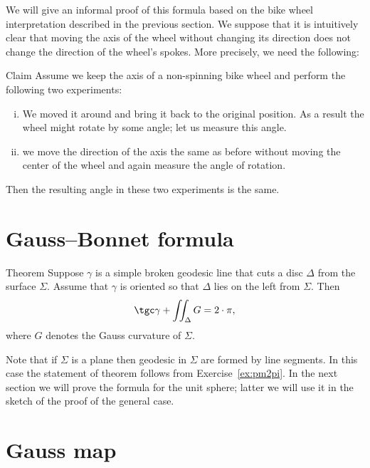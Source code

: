 We will give an informal proof of this formula based on the bike wheel interpretation described in the previous section.
We suppose that it is intuitively clear that moving the axis of the wheel without changing its direction does not change the direction of the wheel's spokes.
More precisely, we need the following:

\begin{thm}{Claim}
Assume we keep the axis of a non-spinning bike wheel and perform the following two experiments:

\begin{enumerate}[(i)]
\item We moved it around and bring it back to the original position. 
As a result the wheel might rotate by some angle; let us measure this angle.

\item we move the direction of the axis the same as before without moving the center of the wheel and again measure the angle of rotation.
\end{enumerate}

Then the resulting angle in these two experiments is the same. 
\end{thm}

\section{Gauss--Bonnet formula}

\begin{thm}{Theorem}
Suppose $\gamma$ is a simple broken geodesic line that cuts a disc $\Delta$ from the surface $\Sigma$.
Assume that $\gamma$ is oriented so that $\Delta$ lies on the left from $\Sigma$.
Then 
\[\tgc\gamma+\iint_\Delta G=2\cdot \pi,\]
where $G$ denotes the Gauss curvature of $\Sigma$.
\end{thm}

Note that if $\Sigma$ is a plane then geodesic in $\Sigma$ are formed by line segments.
In this case the statement of theorem follows from Exercise~\ref{ex:pm2pi}.
In the next section we will prove the formula for the unit sphere;
latter we will use it in the sketch of the proof of the general case.









\section{Gauss map}

